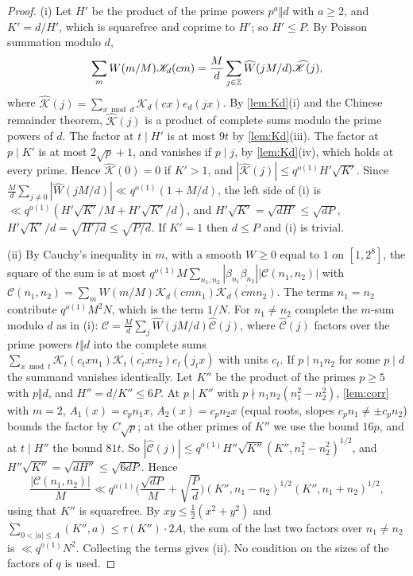 \documentclass[11pt,colorlinks]{charlie}
\begin{document}
\begin{proof}
(i) Let $H'$ be the product of the prime powers $p^a\Vert d$ with $a\ge2$, and $K'=d/H'$, which is squarefree and coprime to $H'$; so $H'\le P$. By Poisson summation modulo $d$,
\[
 \sum_mW(m/M)\mathscr K_d(cm)=\frac Md\sum_{j\in\mathbb{Z}}\widehat W(jM/d)\widehat{\mathscr K}(j),
\]
where $\widehat{\mathscr K}(j)=\sum_{x\bmod d}\mathscr K_d(cx)e_d(jx)$.
By \cref{lem:Kd}(i) and the Chinese remainder theorem, $\widehat{\mathscr K}(j)$ is a product of complete sums modulo the prime powers of $d$. The factor at $t\mid H'$ is at most $9t$ by \cref{lem:Kd}(iii). The factor at $p\mid K'$ is at most $2\sqrt p+1$, and vanishes if $p\mid j$, by \cref{lem:Kd}(iv), which holds at every prime. Hence $\widehat{\mathscr K}(0)=0$ if $K'>1$, and $|\widehat{\mathscr K}(j)|\le q^{o(1)}H'\sqrt{K'}$. Since $\frac Md\sum_{j\ne0}|\widehat W(jM/d)|\ll q^{o(1)}(1+M/d)$, the left side of (i) is $\ll q^{o(1)}(H'\sqrt{K'}/M+H'\sqrt{K'}/d)$, and $H'\sqrt{K'}=\sqrt{dH'}\le\sqrt{dP}$, $H'\sqrt{K'}/d=\sqrt{H'/d}\le\sqrt{P/d}$. If $K'=1$ then $d\le P$ and (i) is trivial.

(ii) By Cauchy's inequality in $m$, with a smooth $W\ge0$ equal to $1$ on $[1,2^8]$, the square of the sum is at most $q^{o(1)}M\sum_{n_1,n_2}|\beta_{n_1}\beta_{n_2}||\mathcal C(n_1,n_2)|$ with $\mathcal C(n_1,n_2)=\sum_mW(m/M)\mathscr K_d(cmn_1)\overline{\mathscr K_d(cmn_2)}$. The terms $n_1=n_2$ contribute $q^{o(1)}M^2N$, which is the term $1/N$. For $n_1\ne n_2$ complete the $m$-sum modulo $d$ as in (i): $\mathcal C=\frac Md\sum_j\widehat W(jM/d)\widehat{\mathcal C}(j)$, where $\widehat{\mathcal C}(j)$ factors over the prime powers $t\Vert d$ into the complete sums $\sum_{x\bmod t}\mathscr K_t(c_txn_1)\overline{\mathscr K_t(c_txn_2)}e_t(j_tx)$ with units $c_t$. If $p\mid n_1n_2$ for some $p\mid d$ the summand vanishes identically. Let $K''$ be the product of the primes $p\ge5$ with $p\Vert d$, and $H''=d/K''\le6P$. At $p\mid K''$ with $p\nmid n_1n_2(n_1^2-n_2^2)$, \cref{lem:corr} with $m=2$, $A_1(x)=c_pn_1x$, $A_2(x)=c_pn_2x$ (equal roots, slopes $c_pn_1\ne\pm c_pn_2$) bounds the factor by $C\sqrt p$; at the other primes of $K''$ we use the bound $16p$, and at $t\mid H''$ the bound $81t$. So $|\widehat{\mathcal C}(j)|\le q^{o(1)}H''\sqrt{K''}(K'',n_1^2-n_2^2)^{1/2}$, and $H''\sqrt{K''}=\sqrt{dH''}\le\sqrt{6dP}$. Hence
\[
 \frac{|\mathcal C(n_1,n_2)|}M\ll q^{o(1)}\Big(\frac{\sqrt{dP}}M+\sqrt{\frac Pd}\Big)(K'',n_1-n_2)^{1/2}(K'',n_1+n_2)^{1/2},
\]
using that $K''$ is squarefree. By $xy\le\frac12(x^2+y^2)$ and $\sum_{0<|a|\le A}(K'',a)\le\tau(K'')\cdot2A$, the sum of the last two factors over $n_1\ne n_2$ is $\ll q^{o(1)}N^2$. Collecting the terms gives (ii). No condition on the sizes of the factors of $q$ is used.


\end{proof}
\end{document}
